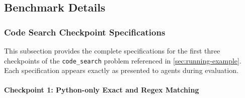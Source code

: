 \subsection{Benchmark Details}\label{sec:appendix-benchmark}

\subsubsection{Code Search Checkpoint Specifications}\label{sec:appendix-code-search}

This subsection provides the complete specifications for the first three checkpoints of the \texttt{code\_search} problem referenced in \autoref{sec:running-example}. Each specification appears exactly as presented to agents during evaluation.

\paragraph{Checkpoint 1: Python-only Exact and Regex Matching}
\label{sec:appendix-cp1}

